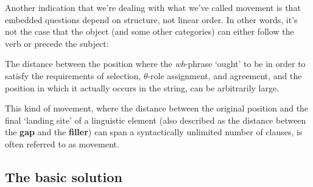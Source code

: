 \documentclass{article}
\begin{document}
Another indication that we're dealing with what we've called movement is that embedded questions depend on structure, not linear order. In other words, it's not the case that the object (and some other categories) can either follow the verb or precede the subject:
\begin{exe}
\end{exe}

The distance between the position where the \emph{wh}-phrase `ought' to be in order to satisfy the requirements of selection, $\theta$-role assignment, and agreement, and the position in which it actually occurs in the string, can be arbitrarily large.

This kind of movement, where the distance between the original position and the final `landing site' of a linguistic element (also described as the distance between the \textbf{gap} and the \textbf{filler}) can span a syntactically unlimited number of clauses, is often referred to as  movement.

\subsection{The basic solution}
\end{document}

